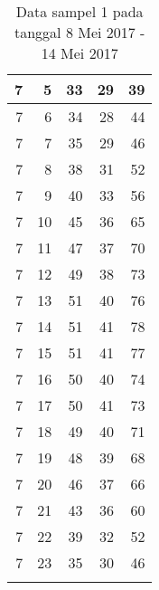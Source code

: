 \begin{longtable}{|r|r|r|r|r|}
    7     & 5     & 33    & 29    & 39 \\\hline
    7     & 6     & 34    & 28    & 44 \\\hline
    7     & 7     & 35    & 29    & 46 \\\hline
    7     & 8     & 38    & 31    & 52 \\\hline
    7     & 9     & 40    & 33    & 56 \\\hline
    7     & 10    & 45    & 36    & 65 \\\hline
    7     & 11    & 47    & 37    & 70 \\\hline
    7     & 12    & 49    & 38    & 73 \\\hline
    7     & 13    & 51    & 40    & 76 \\\hline
    7     & 14    & 51    & 41    & 78 \\\hline
    7     & 15    & 51    & 41    & 77 \\\hline
    7     & 16    & 50    & 40    & 74 \\\hline
    7     & 17    & 50    & 41    & 73 \\\hline
    7     & 18    & 49    & 40    & 71 \\\hline
    7     & 19    & 48    & 39    & 68 \\\hline
    7     & 20    & 46    & 37    & 66 \\\hline
    7     & 21    & 43    & 36    & 60 \\\hline
    7     & 22    & 39    & 32    & 52 \\\hline
    7     & 23    & 35    & 30    & 46 \\\hline
	\caption{Data sampel 1 pada tanggal 8 Mei 2017 - 14 Mei 2017}
  \label{tab:datasample18052017}%
\end{longtable}%


  
